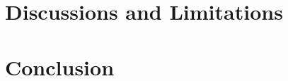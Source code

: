 \documentclass[manuscript,screen,review, nonacm=true]{acmart}
\begin{document}
\section{Discussions and Limitations} \label{sec:discussions}




\section{Conclusion} \label{sec:conclusion}





\end{document}
